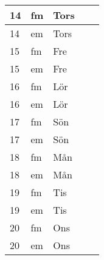 \documentclass[a4paper]{article}
\begin{document}
\begin{table}[ht!]
\begin{tabular}{lllp{7cm}p{7cm}}
\multicolumn{1}{|l|}{14} & \multicolumn{1}{l|}{fm} & \multicolumn{1}{l|}{Tors} & \multicolumn{1}{l|}{} & \multicolumn{1}{l|}{} \\ \hline
\multicolumn{1}{|l|}{14} & \multicolumn{1}{l|}{em} & \multicolumn{1}{l|}{Tors} & \multicolumn{1}{l|}{} & \multicolumn{1}{l|}{} \\ \hline    

\multicolumn{1}{|l|}{15} & \multicolumn{1}{l|}{fm} & \multicolumn{1}{l|}{Fre} & \multicolumn{1}{l|}{} & \multicolumn{1}{l|}{} \\ \hline
\multicolumn{1}{|l|}{15} & \multicolumn{1}{l|}{em} & \multicolumn{1}{l|}{Fre} & \multicolumn{1}{l|}{} & \multicolumn{1}{l|}{} \\ \hline    

\multicolumn{1}{|l|}{16} & \multicolumn{1}{l|}{fm} & \multicolumn{1}{l|}{Lör} & \multicolumn{1}{l|}{} & \multicolumn{1}{l|}{} \\ \hline
\multicolumn{1}{|l|}{16} & \multicolumn{1}{l|}{em} & \multicolumn{1}{l|}{Lör} & \multicolumn{1}{l|}{} & \multicolumn{1}{l|}{} \\ \hline    

\multicolumn{1}{|l|}{17} & \multicolumn{1}{l|}{fm} & \multicolumn{1}{l|}{Sön} & \multicolumn{1}{l|}{} & \multicolumn{1}{l|}{} \\ \hline
\multicolumn{1}{|l|}{17} & \multicolumn{1}{l|}{em} & \multicolumn{1}{l|}{Sön} & \multicolumn{1}{l|}{} & \multicolumn{1}{l|}{} \\ \hline    

\multicolumn{1}{|l|}{18} & \multicolumn{1}{l|}{fm} & \multicolumn{1}{l|}{Mån} & \multicolumn{1}{l|}{} & \multicolumn{1}{l|}{} \\ \hline
\multicolumn{1}{|l|}{18} & \multicolumn{1}{l|}{em} & \multicolumn{1}{l|}{Mån} & \multicolumn{1}{l|}{} & \multicolumn{1}{l|}{} \\ \hline    

\multicolumn{1}{|l|}{19} & \multicolumn{1}{l|}{fm} & \multicolumn{1}{l|}{Tis} & \multicolumn{1}{l|}{} & \multicolumn{1}{l|}{} \\ \hline
\multicolumn{1}{|l|}{19} & \multicolumn{1}{l|}{em} & \multicolumn{1}{l|}{Tis} & \multicolumn{1}{l|}{} & \multicolumn{1}{l|}{} \\ \hline    

\multicolumn{1}{|l|}{20} & \multicolumn{1}{l|}{fm} & \multicolumn{1}{l|}{Ons} & \multicolumn{1}{l|}{} & \multicolumn{1}{l|}{} \\ \hline
\multicolumn{1}{|l|}{20} & \multicolumn{1}{l|}{em} & \multicolumn{1}{l|}{Ons} & \multicolumn{1}{l|}{} & \multicolumn{1}{l|}{} \\ \hline    


\end{tabular}
\end{table}
\end{document}

